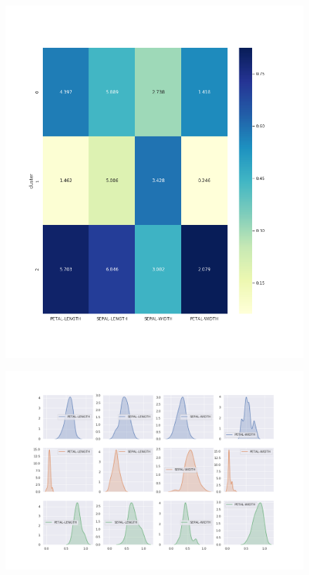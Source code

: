 \documentclass[spanish]{beamer}
\begin{document}
\begin{frame}
\begin{figure}[h]
\centering
\includegraphics[scale=0.29]{dani/heatmapK-MeansIRIS.png}
\end{figure}
\end{frame}

\begin{frame}
\begin{figure}[h]
\centering
\includegraphics[scale=0.29]{dani/kdeplotK-MeansIRIS.png}
\end{figure}
\end{frame}
\end{document}
